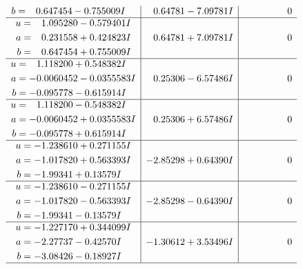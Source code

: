 \documentclass[1p]{elsarticle_modified}
\theoremstyle{definition}
\begin{document}
$$\begin{array}{c|c|c}
\begin{aligned}
b &= \phantom{-}0.647454 - 0.755009 I\end{aligned}
 & \phantom{-}0.64781 - 7.09781 I & \phantom{-0.000000 } 0 \\ \hline\begin{aligned}
u &= \phantom{-}1.095280 - 0.579401 I \\
a &= \phantom{-}0.231558 + 0.424823 I \\
b &= \phantom{-}0.647454 + 0.755009 I\end{aligned}
 & \phantom{-}0.64781 + 7.09781 I & \phantom{-0.000000 } 0 \\ \hline\begin{aligned}
u &= \phantom{-}1.118200 + 0.548382 I \\
a &= -0.0060452 - 0.0355583 I \\
b &= -0.095778 - 0.615914 I\end{aligned}
 & \phantom{-}0.25306 - 6.57486 I & \phantom{-0.000000 } 0 \\ \hline\begin{aligned}
u &= \phantom{-}1.118200 - 0.548382 I \\
a &= -0.0060452 + 0.0355583 I \\
b &= -0.095778 + 0.615914 I\end{aligned}
 & \phantom{-}0.25306 + 6.57486 I & \phantom{-0.000000 } 0 \\ \hline\begin{aligned}
u &= -1.238610 + 0.271155 I \\
a &= -1.017820 + 0.563393 I \\
b &= -1.99341 + 0.13579 I\end{aligned}
 & -2.85298 + 0.64390 I & \phantom{-0.000000 } 0 \\ \hline\begin{aligned}
u &= -1.238610 - 0.271155 I \\
a &= -1.017820 - 0.563393 I \\
b &= -1.99341 - 0.13579 I\end{aligned}
 & -2.85298 - 0.64390 I & \phantom{-0.000000 } 0 \\ \hline\begin{aligned}
u &= -1.227170 + 0.344099 I \\
a &= -2.27737 - 0.42570 I \\
b &= -3.08426 - 0.18927 I\end{aligned}
 & -1.30612 + 3.53496 I & \phantom{-0.000000 } 0\\
 \hline 
 \end{array}$$\newpage$$\begin{array}{c|c|c}  

\end{array}$$
\end{document}

